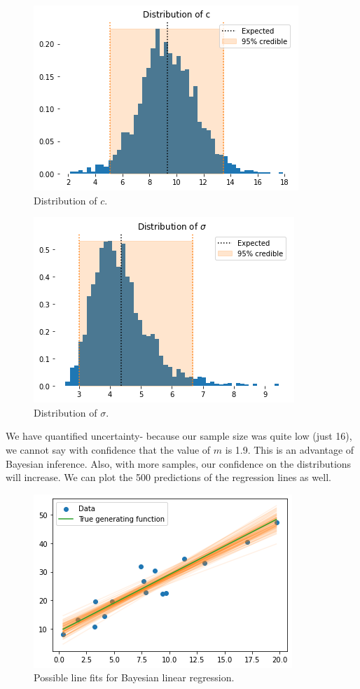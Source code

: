 \documentclass[a4paper, openany]{memoir}
\begin{document}
\begin{figure}[H]
    \centering
    \includegraphics[scale=0.5]{src/5.33 distribution of c.png}
    \caption{Distribution of $c$.}
\end{figure}
\begin{figure}[H]
    \centering
    \includegraphics[scale=0.5]{src/5.34 distribution of sigma.png}
    \caption{Distribution of $\sigma$.}
\end{figure}
\noindent We have quantified uncertainty- because our sample size was quite low (just 16), we cannot say with confidence that the value of $m$ is 1.9. This is an advantage of Bayesian inference. Also, with more samples, our confidence on the distributions will increase. We can plot the 500 predictions of the regression lines as well. 
\begin{figure}[H]
    \centering
    \includegraphics[scale=0.6]{src/5.35 linefits bayesian.png}
    \caption{Possible line fits for Bayesian linear regression.}
\end{figure}
\end{document}
